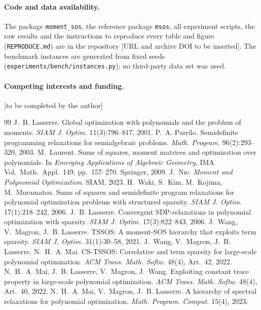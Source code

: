 \documentclass[a4paper,11pt]{article}
\theoremstyle{plain}
\theoremstyle{definition}
\theoremstyle{remark}
\begin{document}
\paragraph{Code and data availability.} The package \texttt{moment\_sos}, the reference package \texttt{msos}, all experiment scripts, the raw results and the instructions to reproduce every table and figure (\texttt{REPRODUCE.md}) are in the repository [URL and archive DOI to be inserted]. The benchmark instances are generated from fixed seeds (\texttt{experiments/bench/instances.py}); no third-party data set was used.
\paragraph{Competing interests and funding.} [to be completed by the author]

\begin{thebibliography}{99}\small
{} J.~B. Lasserre. Global optimization with polynomials and the problem of moments. \emph{SIAM J. Optim.} 11(3):796--817, 2001.
 P.~A. Parrilo. Semidefinite programming relaxations for semialgebraic problems. \emph{Math. Program.} 96(2):293--320, 2003.
 M.~Laurent. Sums of squares, moment matrices and optimization over polynomials. In \emph{Emerging Applications of Algebraic Geometry}, IMA Vol.\ Math.\ Appl.\ 149, pp.\ 157--270. Springer, 2009.
 J.~Nie. \emph{Moment and Polynomial Optimization}. SIAM, 2023.
 H.~Waki, S.~Kim, M.~Kojima, M.~Muramatsu. Sums of squares and semidefinite program relaxations for polynomial optimization problems with structured sparsity. \emph{SIAM J. Optim.} 17(1):218--242, 2006.
 J.~B. Lasserre. Convergent SDP-relaxations in polynomial optimization with sparsity. \emph{SIAM J. Optim.} 17(3):822--843, 2006.
 J.~Wang, V.~Magron, J.~B. Lasserre. TSSOS: A moment-SOS hierarchy that exploits term sparsity. \emph{SIAM J. Optim.} 31(1):30--58, 2021.
 J.~Wang, V.~Magron, J.~B. Lasserre, N.~H.~A. Mai. CS-TSSOS: Correlative and term sparsity for large-scale polynomial optimization. \emph{ACM Trans. Math. Softw.} 48(4), Art.~42, 2022.
 N.~H.~A. Mai, J.~B. Lasserre, V.~Magron, J.~Wang. Exploiting constant trace property in large-scale polynomial optimization. \emph{ACM Trans. Math. Softw.} 48(4), Art.~40, 2022.
 N.~H.~A. Mai, V.~Magron, J.~B. Lasserre. A hierarchy of spectral relaxations for polynomial optimization. \emph{Math. Program. Comput.} 15(4), 2023.

\end{thebibliography}
\end{document}
